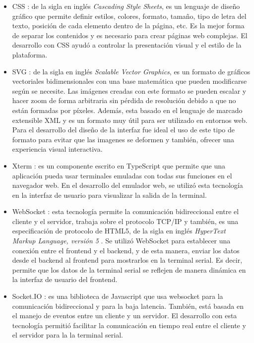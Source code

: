 \begin{itemize}
	\item CSS \citep{CSS}: de la sigla en inglés \textit{Cascading Style Sheets},
	es un lenguaje de diseño gráfico que permite definir estilos, colores, formato, tamaño, tipo de letra del texto, posición de cada elemento dentro de la página, etc. Es la mejor forma de separar los contenidos y es necesario para crear páginas web complejas. El desarrollo con CSS ayudó a controlar la presentación visual y el estilo de la plataforma.

    \item SVG \citep{SVG}: de la sigla en inglés \textit{Scalable Vector Graphics}, es un formato de gráficos vectoriales bidimensionales con una base matemática que pueden modificarse según se necesite. Las imágenes creadas con este formato se pueden escalar y hacer zoom de forma arbitraria sin pérdida de resolución debido a que no están formadas por píxeles. Además, esta basado en el lenguaje de marcado extensible XML \citep{XML} y es un formato muy útil para ser utilizado en entornos web. 
Para el desarrollo del diseño de la interfaz fue ideal el uso de este tipo de formato para evitar que las imagenes se deformen y también, ofrecer una experiencia visual interactiva.

    \item Xterm \citep{Xterm}: es un componente escrito en TypeScript \citep{TypeScript} que permite que una aplicación pueda usar terminales emuladas con todas sus funciones en el navegador web. 
En el desarrollo del emulador web, se utilizó esta tecnología en la interfaz de usuario para visualizar la salida de la terminal.

    \item WebSocket \citep{WebSocket}: esta tecnología permite la comunicación bidireccional entre el cliente y el servidor, trabaja sobre el protocolo TCP/IP y también, es una especificación de protocolo de HTML5, de la sigla en inglés \textit{HyperText Markup Language, versión 5} \citep{HTML5}. 
Se utilizó WebSocket para establecer una conexión entre el frontend y el backend, y de esta manera, enviar los datos desde el backend al frontend para mostrarlos en la terminal serial. Es decir, permite que los datos de la terminal serial se reflejen de manera dinámica en la interfaz de usuario del frontend.
       
    \item Socket.IO \citep{Socket}: es una biblioteca de Javascript que usa websocket para la comunicación bidireccional y para la baja latencia. También, está basada en el manejo de eventos entre un cliente y un servidor. El desarrollo con esta tecnología permitió facilitar la comunicación en tiempo real entre el cliente y el servidor para la la terminal serial.
    

\end{itemize}
